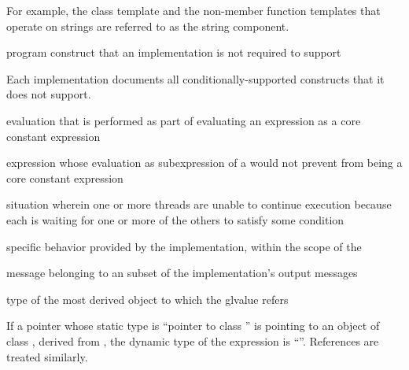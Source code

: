 \begin{defnote}
For example, the class template 
and the non-member function templates
that operate on strings are referred to as the string component.
\end{defnote}

%
program construct that an implementation is not required to support

\begin{defnote}
Each implementation documents all conditionally-supported
constructs that it does not support.
\end{defnote}

%
evaluation that is performed as part of evaluating an expression
as a core constant expression

%
expression whose evaluation as subexpression of a
 would not prevent 
from being a core constant expression

%
situation wherein
one or more threads are unable to continue execution because each is
 waiting for one or more of the others to satisfy some condition

%
specific behavior provided by the implementation,
within the scope of the 

%
message belonging to an  subset of the
implementation's output messages

%
 type of the most derived object to which the
glvalue refers

\begin{example}
If a pointer  whose static type is ``pointer to
class '' is pointing to an object of class , derived
from , the dynamic type of the
expression  is ``''. References are
treated similarly.
\end{example}

